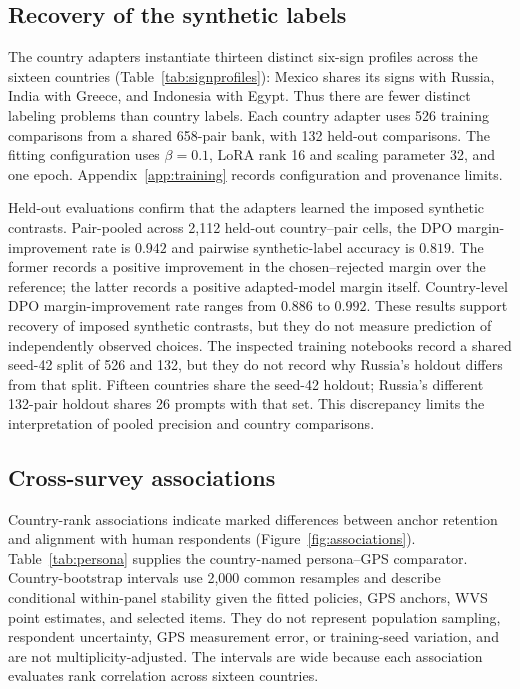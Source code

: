 \subsection{Recovery of the synthetic labels}
The country adapters instantiate thirteen distinct six-sign profiles across the sixteen countries (Table~\ref{tab:signprofiles}): Mexico shares its signs with Russia, India with Greece, and Indonesia with Egypt. Thus there are fewer distinct labeling problems than country labels. Each country adapter uses 526 training comparisons from a shared 658-pair bank, with 132 held-out comparisons. The fitting configuration uses $\beta=0.1$, LoRA rank 16 and scaling parameter 32, and one epoch. Appendix~\ref{app:training} records configuration and provenance limits.


Held-out evaluations confirm that the adapters learned the imposed synthetic contrasts. Pair-pooled across 2,112 held-out country--pair cells, the DPO margin-improvement rate is $0.942$ and pairwise synthetic-label accuracy is $0.819$. The former records a positive improvement in the chosen--rejected margin over the reference; the latter records a positive adapted-model margin itself. Country-level DPO margin-improvement rate ranges from $0.886$ to $0.992$. These results support recovery of imposed synthetic contrasts, but they do not measure prediction of independently observed choices. The inspected training notebooks record a shared seed-42 split of 526 and 132, but they do not record why Russia's holdout differs from that split. Fifteen countries share the seed-42 holdout; Russia's different 132-pair holdout shares 26 prompts with that set. This discrepancy limits the interpretation of pooled precision and country comparisons.

\subsection{Cross-survey associations}
Country-rank associations indicate marked differences between anchor retention and alignment with human respondents (Figure~\ref{fig:associations}). Table~\ref{tab:persona} supplies the country-named persona--GPS comparator. Country-bootstrap intervals use 2,000 common resamples and describe conditional within-panel stability given the fitted policies, GPS anchors, WVS point estimates, and selected items. They do not represent population sampling, respondent uncertainty, GPS measurement error, or training-seed variation, and are not multiplicity-adjusted. The intervals are wide because each association evaluates rank correlation across sixteen countries.

